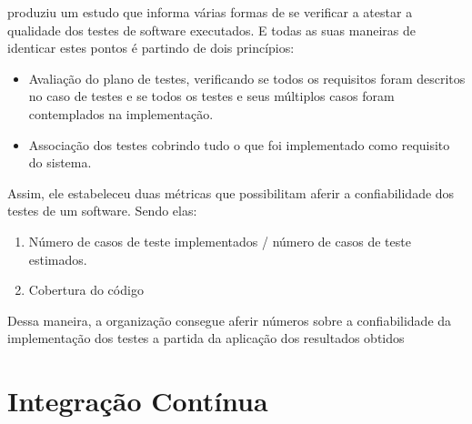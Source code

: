 \cite{e07} produziu um estudo que informa várias formas de se verificar a atestar
a qualidade dos testes de software executados. E todas as suas maneiras de identicar
estes pontos é partindo de dois princípios:

\begin{itemize}
\item Avaliação do plano de testes, verificando se todos os requisitos foram
descritos no caso de testes e se todos os testes e seus múltiplos casos foram
contemplados na implementação.
\item Associação dos testes cobrindo tudo o que foi implementado como requisito
do sistema.
\end{itemize}

Assim, ele estabeleceu duas métricas que possibilitam aferir a confiabilidade
dos testes de um software. Sendo elas:

\begin{enumerate}
\item Número de casos de teste implementados / número de casos de teste estimados.
\item Cobertura do código
\end{enumerate}

Dessa maneira, a organização consegue aferir números sobre a confiabilidade
da implementação dos testes a partida da aplicação dos resultados obtidos  \cite{e07}
\section{Integração Contínua}

